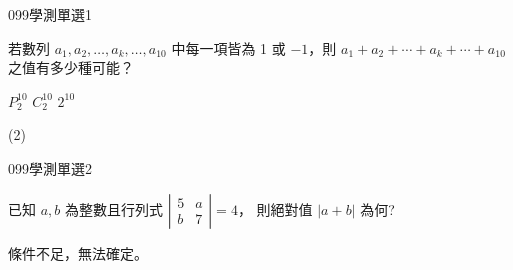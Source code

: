 \begin{QUESTIONS}
    \begin{QUESTION}
        \begin{ExamInfo}{099}{學測}{單選}{1}
        \end{ExamInfo}
        \begin{ExamAnsRateInfo}{49}{82}{49}{16}
        \end{ExamAnsRateInfo}
        \begin{QBODY}
			若數列 $a_1,a_2,\dots,a_k,\dots,a_{10}$ 中每一項皆為 1 或 $-1$，則 $a_1 +a_2 +\cdots +a_k +\cdots+a_{10}$ 之值有多少種可能？
			\begin{QOPS} 
				\QOP $P^{10}_2$    
				\QOP $C^{10}_2$    
				\QOP $2^{10}$
			\end{QOPS}
        \end{QBODY}
        \begin{QFROMS}
        \end{QFROMS}
        \begin{QTAGS}\end{QTAGS}
        \begin{QANS}
            (2)
        \end{QANS}
        \begin{QSOLLIST}
        \end{QSOLLIST}
        \begin{QEMPTYSPACE}
        \end{QEMPTYSPACE}
    \end{QUESTION}
    \begin{QUESTION}
        \begin{ExamInfo}{099}{學測}{單選}{2}
        \end{ExamInfo}
        \begin{ExamAnsRateInfo}{58}{83}{62}{29}
        \end{ExamAnsRateInfo}
        \begin{QBODY}
			已知 $a,b$ 為整數且行列式 $\left| \begin{array}{cc} 5 & a \\ b & 7  \end{array}\right| =4$，
			則絕對值 $|a+b|$ 為何? 
			\begin{QOPS} 
				\QOP 16 
				\QOP 31 
				\QOP 32 
				\QOP 39 
				\QOP 條件不足，無法確定。
			\end{QOPS}
        \end{QBODY}
        \begin{QFROMS}

\end{QFROMS}
\end{QUESTION}
\end{QUESTIONS}
